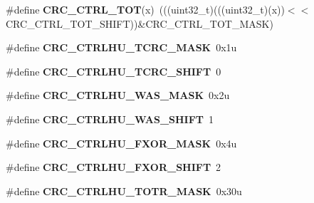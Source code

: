 \begin{DoxyCompactItemize}
\item 
\#define {\bfseries C\+R\+C\+\_\+\+C\+T\+R\+L\+\_\+\+T\+OT}(x)~(((uint32\+\_\+t)(((uint32\+\_\+t)(x))$<$$<$C\+R\+C\+\_\+\+C\+T\+R\+L\+\_\+\+T\+O\+T\+\_\+\+S\+H\+I\+FT))\&C\+R\+C\+\_\+\+C\+T\+R\+L\+\_\+\+T\+O\+T\+\_\+\+M\+A\+SK)\hypertarget{group__CRC__Register__Masks_gae8b301db96fe11408f82b997c5452bf7}{}\label{group__CRC__Register__Masks_gae8b301db96fe11408f82b997c5452bf7}

\item 
\#define {\bfseries C\+R\+C\+\_\+\+C\+T\+R\+L\+H\+U\+\_\+\+T\+C\+R\+C\+\_\+\+M\+A\+SK}~0x1u\hypertarget{group__CRC__Register__Masks_ga1d62eb284fb7d178fddaf03e10dcd19c}{}\label{group__CRC__Register__Masks_ga1d62eb284fb7d178fddaf03e10dcd19c}

\item 
\#define {\bfseries C\+R\+C\+\_\+\+C\+T\+R\+L\+H\+U\+\_\+\+T\+C\+R\+C\+\_\+\+S\+H\+I\+FT}~0\hypertarget{group__CRC__Register__Masks_ga9299763dd32745d443ab84a9911ad775}{}\label{group__CRC__Register__Masks_ga9299763dd32745d443ab84a9911ad775}

\item 
\#define {\bfseries C\+R\+C\+\_\+\+C\+T\+R\+L\+H\+U\+\_\+\+W\+A\+S\+\_\+\+M\+A\+SK}~0x2u\hypertarget{group__CRC__Register__Masks_ga9c716f81782ec7e214f823ef98fa8eb3}{}\label{group__CRC__Register__Masks_ga9c716f81782ec7e214f823ef98fa8eb3}

\item 
\#define {\bfseries C\+R\+C\+\_\+\+C\+T\+R\+L\+H\+U\+\_\+\+W\+A\+S\+\_\+\+S\+H\+I\+FT}~1\hypertarget{group__CRC__Register__Masks_gacd050b23263379193cf9cde3e1567ab1}{}\label{group__CRC__Register__Masks_gacd050b23263379193cf9cde3e1567ab1}

\item 
\#define {\bfseries C\+R\+C\+\_\+\+C\+T\+R\+L\+H\+U\+\_\+\+F\+X\+O\+R\+\_\+\+M\+A\+SK}~0x4u\hypertarget{group__CRC__Register__Masks_ga0a552f60712b28cd96e939d4324157df}{}\label{group__CRC__Register__Masks_ga0a552f60712b28cd96e939d4324157df}

\item 
\#define {\bfseries C\+R\+C\+\_\+\+C\+T\+R\+L\+H\+U\+\_\+\+F\+X\+O\+R\+\_\+\+S\+H\+I\+FT}~2\hypertarget{group__CRC__Register__Masks_ga505ca51d1aad1610b44bad4580f2637f}{}\label{group__CRC__Register__Masks_ga505ca51d1aad1610b44bad4580f2637f}

\item 
\#define {\bfseries C\+R\+C\+\_\+\+C\+T\+R\+L\+H\+U\+\_\+\+T\+O\+T\+R\+\_\+\+M\+A\+SK}~0x30u\hypertarget{group__CRC__Register__Masks_ga0418249380c6e69fc9a949f8da4e60f1}{}\label{group__CRC__Register__Masks_ga0418249380c6e69fc9a949f8da4e60f1}


\end{DoxyCompactItemize}

